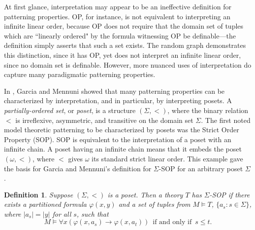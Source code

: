 \documentclass[10pt,a4paper]{amsart}
\newcommand{\bbQ}{\mathbb{Q}}
\newcommand{\bbZ}{\mathbb{Z}}
\newcommand{\IFF}{\enspace\text{if and only if}\enspace}
\newcommand{\vphi}{\varphi}
\newtheorem{definition}{Definition}
\begin{document}

At first glance, interpretation may appear to be an ineffective definition for patterning properties. OP, for instance, is not equivalent to interpreting an infinite linear order, because OP does not require that the domain set of tuples which are ``linearly ordered" by the formula witnessing OP be definable---the definition simply asserts that such a set exists. The random graph demonstrates this distinction, since it has OP, yet does not interpret an infinite linear order, since no domain set is definable. However, more nuanced uses of interpretation do capture many paradigmatic patterning properties.

In \cite{garcia2022model}, Garcia and Mennuni showed that many patterning properties can be characterized by interpretation, and in particular, by interpreting posets. A \textit{partially-ordered set}, or \textit{poset}, is a structure $(\Sigma, <)$, where the binary relation $<$ is irreflexive, asymmetric, and transitive on the domain set $\Sigma$. The first noted model theoretic patterning to be characterized by posets was the Strict Order Property (SOP). SOP is equivalent to the interpretation of a poset with an infinite chain. A poset having an infinite chain means that it embeds the poset $(\omega, <)$, where $<$ gives $\omega$ its standard strict linear order. This example gave the basis for Garcia and Mennuni's definition for $\Sigma$-SOP for an arbitrary poset $\Sigma$. 

\begin{definition}
    Suppose $(\Sigma, <)$ is a poset. Then a theory $T$ has $\Sigma$-SOP if there exists a partitioned formula $\vphi(x,y)$ and a set of tuples from $M\models T$, $\{a_s\colon s\in\Sigma\}$, where $|a_s|=|y|$ for all $s$, such that 
    \[M\models \forall x(\vphi(x,a_s)\to\vphi(x,a_t))\IFF s\leq t.\]

\end{definition}

\end{document}
